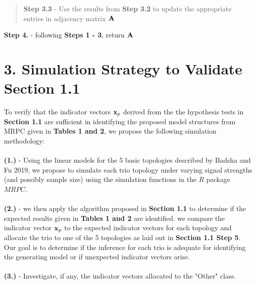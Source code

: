 \documentclass[12pt]{report}
\begin{document}
\begin{quote}
\noindent \textbf{Step 3.3} - Use the results from \textbf{Step 3.2} to update the appropriate entries in adjacency matrix $\bf{A}$\\
\end{quote}

\noindent \textbf{Step 4.} - following \textbf{Steps 1 - 3}, return $\bf A$

\section*{3. Simulation Strategy to Validate Section 1.1}

To verify that the indicator vectors ${\bf x}_p$ derived from the the hypothesis tests in \textbf{Section 1.1} are sufficient in identifying the proposed model structures from MRPC given in \textbf{Tables 1 and 2}, we propose the following simulation methodology: \\
\\

\noindent \textbf{(1.)} - Using the linear models for the 5 basic topologies described by Badsha and Fu 2019, we propose to simulate each trio topology under varying signal strengths (and possibly sample size) using the simulation functions in the $R$ package $MRPC$.\\
\\
\noindent \textbf{(2.)}  - we then apply the algorithm proposed in \textbf{Section 1.1} to determine if the expected results given in \textbf{ Tables 1 and 2} are identified. we compare the indicator vector ${\bf x}_p$ to the expected indicator vectors for each topology and allocate the trio to one of the 5 topologies as laid out in \textbf{Section 1.1 Step 5}. Our goal is to determine if the inference for each trio is adequate for identifying the generating model or if unexpected indicator vectors arise. \\
\\
\textbf{(3.)} - Investigate, if any, the indicator vectors allocated to the "Other" class. 





\newpage
\end{document}
